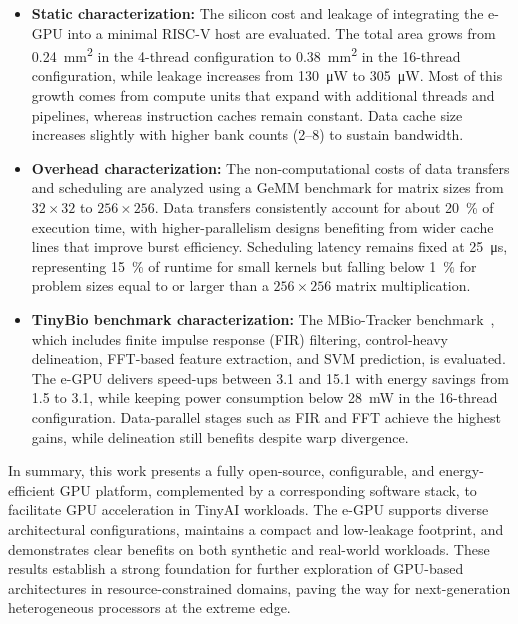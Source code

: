             \vspace{-1em}
            \begin{itemize}
                \item \textbf{Static characterization:} The silicon cost and leakage of integrating the \mbox{e-GPU} into a minimal RISC-V host are evaluated. The total area grows from \SI{0.24}{\milli\meter\squared} in the 4-thread configuration to \SI{0.38}{\milli\meter\squared} in the 16-thread configuration, while leakage increases from \SI{130}{\micro\watt} to \SI{305}{\micro\watt}. Most of this growth comes from compute units that expand with additional threads and pipelines, whereas instruction caches remain constant. Data cache size increases slightly with higher bank counts (2–8) to sustain bandwidth.
            
                \item \textbf{Overhead characterization:} The non-computational costs of data transfers and scheduling are analyzed using a GeMM benchmark for matrix sizes from $32 \times 32$ to $256 \times 256$. Data transfers consistently account for about \SI{20}{\percent} of execution time, with higher-parallelism designs benefiting from wider cache lines that improve burst efficiency. Scheduling latency remains fixed at \SI{25}{\micro\second}, representing \SI{15}{\percent} of runtime for small kernels but falling below \SI{1}{\percent} for problem sizes equal to or larger than a $256 \times 256$ matrix multiplication.
            
                \item \textbf{TinyBio benchmark characterization:} The MBio-Tracker benchmark~\cite{mbio_tracker}, which includes finite impulse response (FIR) filtering, control-heavy delineation, FFT-based feature extraction, and SVM prediction, is evaluated. The \mbox{e-GPU} delivers speed-ups between \SI{3.1}{\times} and \SI{15.1}{\times} with energy savings from \SI{1.5}{\times} to \SI{3.1}{\times}, while keeping power consumption below \SI{28}{\milli\watt} in the 16-thread configuration. Data-parallel stages such as FIR and FFT achieve the highest gains, while delineation still benefits despite warp divergence.
            \end{itemize}
            \vspace{-1em}
            
            In summary, this work presents a fully open-source, configurable, and energy-efficient GPU platform, complemented by a corresponding software stack, to facilitate GPU acceleration in TinyAI workloads. The \mbox{e-GPU} supports diverse architectural configurations, maintains a compact and low-leakage footprint, and demonstrates clear benefits on both synthetic and real-world workloads. These results establish a strong foundation for further exploration of GPU-based architectures in resource-constrained domains, paving the way for next-generation heterogeneous processors at the extreme edge.

